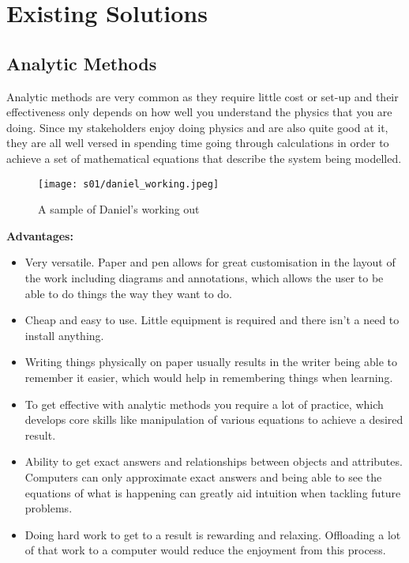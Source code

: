 \section{Existing Solutions}

    \subsection{Analytic Methods}
        Analytic methods are very common as they require little cost or set-up and their effectiveness only depends on how well you understand the physics that you are doing. 
        Since my stakeholders enjoy doing physics and are also quite good at it, they are all well versed in spending time going through calculations in order to achieve a set of mathematical equations that describe the system being modelled. 

        \begin{figure}[!ht]
            \centering
            \texttt{[image: s01/daniel\_working.jpeg]}
            \caption{A sample of Daniel's working out}
            \label{fig:daniel_working}
        \end{figure}

        \textbf{Advantages:}
        \begin{itemize}
            \item Very versatile. Paper and pen allows for great customisation in the layout of the work including diagrams and annotations, which allows the user to be able to do things the way they want to do.
            \item Cheap and easy to use. Little equipment is required and there isn't a need to install anything. 
            \item Writing things physically on paper usually results in the writer being able to remember it easier, which would help in remembering things when learning. 
            \item To get effective with analytic methods you require a lot of practice, which develops core skills like manipulation of various equations to achieve a desired result.
            \item Ability to get exact answers and relationships between objects and attributes. Computers can only approximate exact answers and being able to see the equations of what is happening can greatly aid intuition when tackling future problems.
            \item Doing hard work to get to a result is rewarding and relaxing. Offloading a lot of that work to a computer would reduce the enjoyment from this process.
        \end{itemize}

